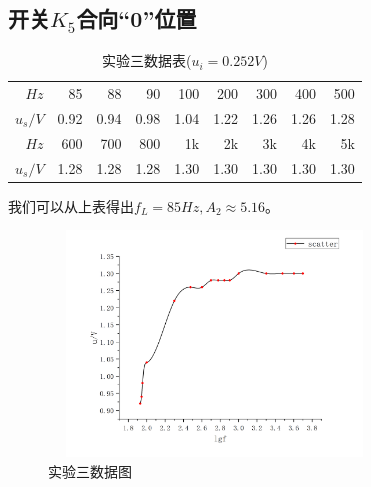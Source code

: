 \documentclass[a4 paper,12pt]{article}
\begin{document}
    \subsection{开关$K_{5}$合向“0”位置}
          \begin{table}[H]
    	\centering
    	\caption{实验三数据表($u_{i}=0.252V$)}
    	\label{实验三数据表}
    	\begin{tabular}{|r|r|r|r|r|r|r|r|r|}
    		\toprule[0.5mm]
    		$Hz$&85&88&90&100&200&300&400&500\\
    		$u_{s}/V$&0.92&0.94&0.98&1.04&1.22&1.26&1.26&1.28\\
    		\midrule
    		$Hz$&600&700&800&1k&2k&3k&4k&5k\\
    		$u_{s}/V$&1.28&1.28&1.28&1.30&1.30&1.30&1.30&1.30\\
    		\bottomrule[0.5mm]
    	\end{tabular}
    \end{table}
    \par 我们可以从上表得出$f_{L}=85Hz,A_{2}\approx 5.16$。
    		\begin{figure}[H]
    	\centering
    	\includegraphics[width=8.8cm,height=6cm]  {实验三.png} 
    	\caption{\label{1} 实验三数据图}
    \end{figure}
\end{document}
